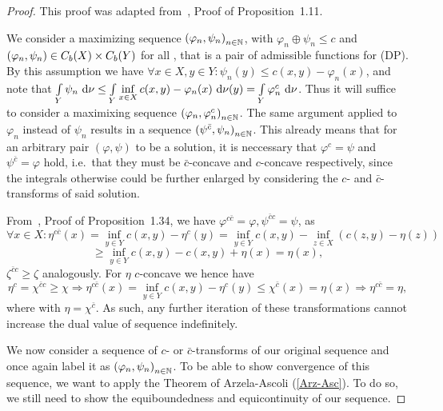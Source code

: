 \begin{proof}
	This proof was adapted from~\cite{San2015}, Proof of Proposition~1.11.

	We consider a maximizing sequence ${(\varphi_n, \psi_n)}_{\NinN}$, with $\varphi_n \oplus \psi_n \le c$ and $(\varphi_n, \psi_n) \in \CF[b]{X} \times \CF[b]{Y}$ for all \NinN{}, that is a pair of admissible functions for (DP). By this assumption we have $\forall x \in X, y \in Y: \psi_n(y) \le c(x, y) - \varphi_n(x)$, and note that $\int\limits_Y \psi_n~\D[\nu] \le \int\limits_Y \inf\limits_{x \in X} c(x, y) - \varphi_n(x)~\Dx[y]{\nu} = \int\limits_Y \varphi_n^c~\D[\nu]$. Thus it will suffice to consider a maximixing sequence ${(\varphi_n, \varphi_n^c)}_{\NinN}$. The same argument applied to $\varphi_n$ instead of $\psi_n$ results in a sequence ${(\psi^{\bar{c}}, \psi_n)}_{\NinN}$. This already means that for an arbitrary pair $(\varphi, \psi)$ to be a solution, it is neccessary that $\varphi^c = \psi$ and $\psi^{\bar{c}} = \varphi$ hold, i.e.~that they must be $\bar{c}$-concave and $c$-concave respectively, since the integrals otherwise could be further enlarged by considering the $c$- and $\bar{c}$-transforms of said solution.

	From~\cite{San2015}, Proof of Proposition~1.34, we have $\varphi^{c\bar{c}} = \varphi, \psi^{\bar{c}c} = \psi$, as
	\[ \forall x \in X: \eta^{c\bar{c}}(x) = \inf\limits_{y \in Y} c(x, y) - \eta^c(y) = \inf\limits_{y \in Y} c(x, y) - \inf\limits_{z \in X} (c(z, y) - \eta(z)) \]
	\[ \ge \inf\limits_{y \in Y} c(x, y) - c(x, y) + \eta(x) = \eta(x), \]
	$\zeta^{\bar{c}c} \ge \zeta$ analogously. For $\eta$ $c$-concave we hence have
	\[ \eta^c = \chi^{\bar{c}c} \ge \chi \Rightarrow \eta^{c\bar{c}}(x) = \inf\limits_{y \in Y} c(x, y) - \eta^c(y) \le \chi^{\bar{c}}(x) = \eta(x) \Rightarrow \eta^{c\bar{c}} = \eta, \]
	where  with $\eta = \chi^{\bar{c}}$. As such, any further iteration of these transformations cannot increase the dual value of sequence indefinitely.

	We now consider a sequence of $c$- or $\bar{c}$-transforms of our original sequence and once again label it as ${(\varphi_n, \psi_n)}_{\NinN}$. To be able to show convergence of this sequence, we want to apply the Theorem of Arzela-Ascoli (\ref{Arz-Asc}). To do so, we still need to show the equiboundedness and equicontinuity of our sequence.
	

\end{proof}
